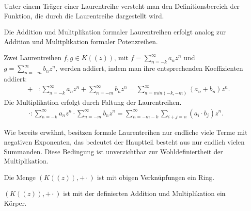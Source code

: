 %
%
%
%
\begin{bem}
Unter einem Träger einer Laurentreihe versteht man den Definitionsbereich der Funktion, die durch die Laurentreihe dargestellt wird.
\end{bem}
%
%
%
%
Die Addition und Mulitplikation formaler Laurentreihen erfolgt analog zur Addition und Mulitplikation formaler Potenzreihen.
\begin{defn}
Zwei Laurentreihen $f, g \in K((z))$, mit $f = \sum_{n=-k}^\infty a_n z^n$ und $g= \sum_{n=-m}^\infty b_n z^n$, werden addiert, indem man ihre entsprechenden Koeffizienten addiert: 
%
\begin{eqnarray*}
&+& \colon \sum_{n=-k}^\infty a_n z^n  +  \sum_{n=-m}^\infty b_n z^n = \sum_{n = min(-k, -m)}^{\infty}(a_n + b_n) z^n.
\end{eqnarray*}
%
%
Die Multiplikation erfolgt durch Faltung der Laurentreihen.
\begin{eqnarray*}
\cdot \colon \sum_{n=-k}^{\infty} a_n z^n  \cdot  \sum_{n=-m}^{\infty} b_n z^n = \sum_{n = -m-k}^{\infty}\sum_{i+j=n}^{}\left(a_i \cdot b_j\right) z^n. 
\end{eqnarray*}
%

\end{defn}
%
\begin{bem}
Wie bereits erwähnt, besitzen formale Laurentreihen nur endliche viele Terme mit negativen Exponenten, das bedeutet der Hauptteil besteht aus nur endlich vielen Summanden. Diese Bedingung ist unverzichtbar zur Wohldefiniertheit der Multiplikation. 
\end{bem}
%
%
%
%
%
\begin{satz}
Die Menge $\left(K((z)), + \cdot\right)$ ist mit obigen Verknüpfungen ein Ring.
\end{satz}
%
\begin{satz}\label{Laurentreihenkoerper} %
$\left(K((z)), + \cdot\right)$ ist mit der definierten Addition und Multiplikation ein Körper. 
\end{satz}
